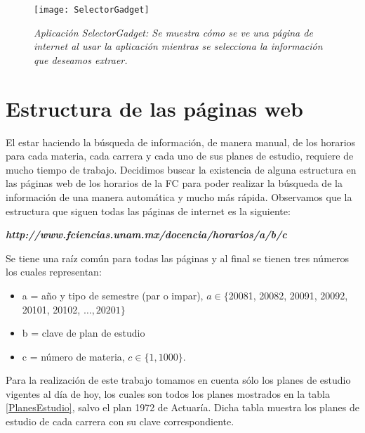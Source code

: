 \begin{figure}[H]
\centering
\texttt{[image: SelectorGadget]} %
\caption[\textit{Aplicación SelectorGadget}]{\textit{Aplicación SelectorGadget: Se muestra cómo se ve una página de internet al usar la aplicación mientras se selecciona la información que deseamos extraer.}}\label{appSelectorGadget}
\end{figure}

\section{Estructura de las páginas web}

El estar haciendo la búsqueda de información, de manera manual, de los horarios para cada materia, cada carrera y cada uno de sus planes de estudio, requiere de mucho tiempo de trabajo. Decidimos buscar la existencia de alguna estructura en las páginas web de los horarios de la FC para poder realizar la búsqueda de la información de una manera automática y mucho más rápida. Observamos que la estructura que siguen todas las páginas de internet es la siguiente:

\begin{center}
\textit{\textbf{http://www.fciencias.unam.mx/docencia/horarios/a/b/c}}
\end{center}

Se tiene una raíz común para todas las páginas y al final se tienen tres números los cuales representan:

\begin{itemize}
\item[ ] a = año y tipo de semestre (par o impar), $a \in \{$20081, 20082, 20091, 20092, 20101, 20102, $\ldots, 20201\}$

\item[ ] b = clave de plan de estudio

\item[ ] c = número de materia, $c \in \{1,1000\}$.
\end{itemize}

Para la realización de este trabajo tomamos en cuenta sólo los planes de estudio vigentes al día de hoy, los cuales son todos los planes mostrados en la tabla \ref{PlanesEstudio}, salvo el plan 1972 de Actuaría. Dicha tabla muestra los planes de estudio de cada carrera con su clave correspondiente.

